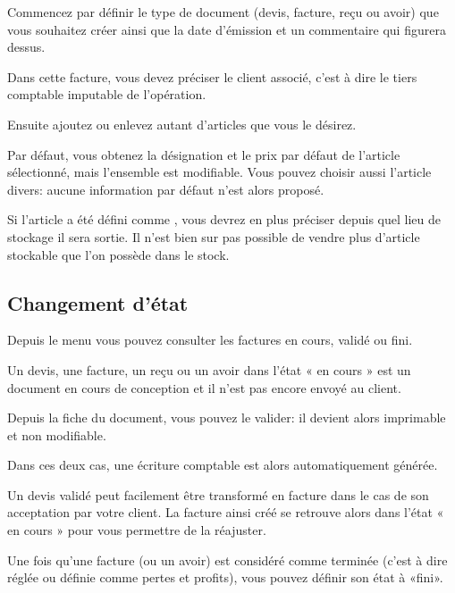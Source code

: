 \documentclass[a4paper,10pt,oneside,french]{sphinxmanual}
\begin{document}
Commencez par définir le type de document (devis, facture, reçu ou avoir) que vous souhaitez créer ainsi que la date d’émission et un commentaire qui figurera dessus.

Dans cette facture, vous devez préciser le client associé, c’est à dire le tiers comptable imputable de l’opération.
\begin{quote}

\noindent{}
\end{quote}

Ensuite ajoutez ou enlevez autant d’articles que vous le désirez.
\begin{quote}

\noindent{}
\end{quote}

Par défaut, vous obtenez la désignation et le prix par défaut de l’article sélectionné, mais l’ensemble est modifiable. Vous pouvez choisir aussi l’article divers: aucune information par défaut n’est alors proposé.

Si l’article a été défini comme , vous devrez en plus préciser depuis quel lieu de stockage il sera sortie.
Il n’est bien sur pas possible de vendre plus d’article stockable que l’on possède dans le stock.


\subsection{Changement d’état}
\label{\detokenize{invoice/create_bill:changement-d-etat}}
Depuis le menu  vous pouvez consulter les factures en cours, validé ou fini.

Un devis, une facture, un reçu ou un avoir dans l’état « en cours » est un document en cours de conception et il n’est pas encore envoyé au client.

Depuis la fiche du document, vous pouvez le valider: il devient alors imprimable et non modifiable.

Dans ces deux cas, une écriture comptable est alors automatiquement générée.

Un devis validé peut facilement être transformé en facture dans le cas de son acceptation par votre client. La facture ainsi créé se retrouve alors dans l’état « en cours » pour vous permettre de la réajuster.

Une fois qu’une facture (ou un avoir) est considéré comme terminée (c’est à dire réglée ou définie comme pertes et profits), vous pouvez définir son état à «fini».
\end{document}

